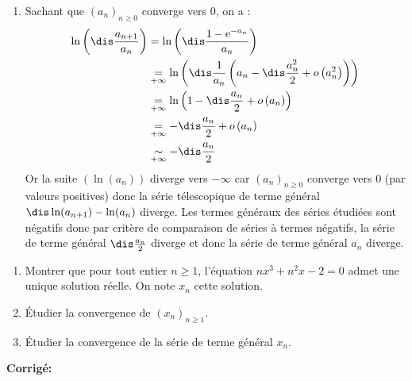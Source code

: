 \documentclass[a4paper,twoside,french,10pt]{VcCours}
\newcommand{\corr}{\textbf{Corrigé:}}
\begin{document}
\begin{enumerate}
\item  Sachant que $(a_n)_{n \geq 0}$ converge vers $0$, on a :
\begin{align*}
\ln \left( {\dis\frac{{a_{n + 1} }}{{a_n }}} \right) & =  \ln \left( {\dis\frac{1 - {\mathrm{e}}^{ - a_n }}{{a_n }}} \right) \\
&  \underset{+ \infty}{=}  \ln \left( \dis\frac{1}{a_n}\left(a_n-\dis\frac{a_n^2}{2}+ o\left(a_n^2\right)\right) \right)\\
& \underset{+ \infty}{=}  	\ln \left(1-\dis\frac{a_n}{2}+ o\left(a_n\right) \right) \\
& \underset{+ \infty}{=} -\dis\frac{a_n}{2}+ o\left(a_n\right) \\
& \underset{+ \infty}{\sim} -\dis\frac{a_n}{2} \\
\end{align*}
Or la suite $(\ln(a_n))$ diverge vers $-\infty$ car $(a_n)_{n \geq 0}$ converge vers $0$ (par valeurs positives) donc la s\'erie t\'elescopique de terme général $\dis \ln(a_{n+1})-\ln(a_n)$ diverge. Les termes g\'en\'eraux des s\'eries étudiées sont n\'egatifs donc par critère de comparaison de séries à termes négatifs, la série de terme général $ \dis\frac{a_n}{2}$ diverge et donc la s\'erie de terme général $a_n$ diverge.
\end{enumerate}

\medskip


\begin{Exercice}{} 
\begin{enumerate}
\item Montrer que pour tout entier $n \geq 1$, l'équation $nx^3+n^2x-2=0$ admet une unique solution réelle. On note $x_n$ cette solution.
\item Étudier la convergence de $(x_n)_{n \geq 1}$.
\item Étudier la convergence de la série de terme général $x_n$.
\end{enumerate}
\end{Exercice}

\corr 
\end{document}
